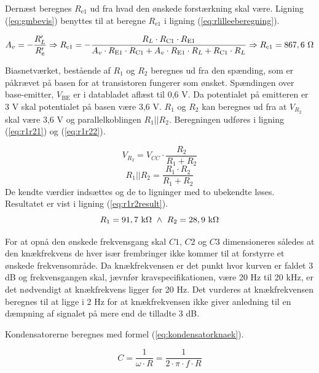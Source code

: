 Dernæst beregnes $R_{\mathrm{e1}}$ ud fra hvad den ønskede forstærkning skal være. Ligning (\ref{eq:gmbevis}) benyttes til at beregne $R_{\mathrm{e1}}$ i ligning (\ref{eq:rlilleeberegning}).

\begin{equation}
\label{eq:rlilleeberegning}
A_v = -\frac{R'_L}{R'_e} \Rightarrow  R_{\mathrm{e1}} =-\frac{R_L \cdot R_{\mathrm{C1}} \cdot R_{\mathrm{E1}}}{A_v \cdot R_{\mathrm{E1}} \cdot R_{\mathrm{C1}} + A_v \cdot R_{\mathrm{E1}} \cdot R_L + R_{\mathrm{C1}} \cdot R_L} \Rightarrow R_{\mathrm{e1}} = 867,6~\ohm
\end{equation}

Biasnetværket, bestående af $R_1$ og $R_2$ beregnes ud fra den spænding, som er påkrævet på basen for at transistoren fungerer som ønsket. Spændingen over base-emitter, $V_{\mathrm{BE}}$ er i databladet aflæst til 0,6 V. Da potentialet på emitteren er 3 V skal potentialet på basen være 3,6 V. $R_1$ og $R_2$ kan beregnes ud fra at $V_{R_2}$ skal være 3,6 V og parallelkoblingen $R_1||R_2$. Beregningen udføres i ligning (\ref{eq:r1r21}) og (\ref{eq:r1r22}).

\begin{equation}
V_{R_2} = V_{CC} \cdot \frac{R_2}{R_1+R_2} 
\label{eq:r1r21}
\end{equation}
\begin{equation}
R_1||R_2 = \frac{R_1 \cdot R_2}{R_1 + R_2}
\label{eq:r1r22}
\end{equation}
De kendte værdier indsættes og de to ligninger med to ubekendte løses. Resultatet er vist i ligning (\ref{eq:r1r2result}).
\begin{equation}
R_1 = 91,7~\mathrm{k}\ohm ~ \wedge ~ R_2=28,9~\mathrm{k}\ohm
\label{eq:r1r2result}
\end{equation}

For at opnå den ønskede frekvensgang skal $C1$, $C2$ og $C3$ dimensioneres således at den knækfrekvens de hver især frembringer ikke kommer til at forstyrre et ønskede frekvensområde. Da knækfrekvensen er det punkt hvor kurven er faldet 3 dB og frekvensgangen skal, jævnfør kravspecifikationen, være 20 Hz til 20 kHz, er det nødvendigt at knækfrekvens  ligger før 20 Hz. Det vurderes at knækfrekvensen beregnes til at ligge i 2 Hz for at knækfrekvensen ikke giver anledning til en dæmpning af signalet på mere end de tilladte 3 dB.

Kondensatorerne beregnes med formel (\ref{eq:kondensatorknaek}).

\begin{equation}
C=\frac{1}{\omega \cdot R}=\frac{1}{2\cdot \pi \cdot f \cdot R}
\label{eq:kondensatorknaek}
\end{equation}


